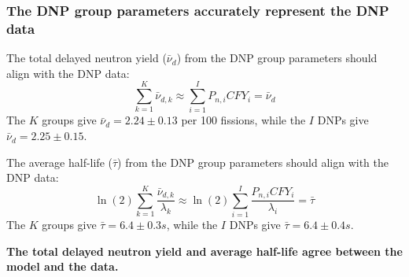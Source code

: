 \begin{frame}
\frametitle{The \gls{DNP} group parameters accurately represent the \gls{DNP} data}
\begin{block}{The total delayed neutron yield ($\bar{\nu}_d$) from the \gls{DNP} group parameters should align with the \gls{DNP} data:}
\begin{equation}
	\sum_{k=1}^{K} \bar{\nu}_{d,k} \approx \sum_{i=1}^I P_{n,i} CFY_i = \bar{\nu}_d
\end{equation}
The $K$ groups give $\bar{\nu}_d = 2.24 \pm 0.13$ per 100 fissions, while the $I$ \glspl{DNP} give $\bar{\nu}_d=2.25 \pm 0.15$.
\pause
\end{block}
\begin{block}{The average half-life ($\bar{\tau}$) from the \gls{DNP} group parameters should align with the \gls{DNP} data:}
\begin{equation}
	\ln (2) \sum_{k=1}^{K} \frac{\bar{\nu}_{d, k}}{\lambda_k} \approx \ln (2) \sum_{i=1}^I \frac{P_{n,i} CFY_i}{\lambda_i} = \bar{\tau}
\end{equation}
The $K$ groups give $\bar{\tau} = 6.4 \pm 0.3 s$, while the $I$ \glspl{DNP} give $\bar{\tau} = 6.4 \pm 0.4 s$.
\end{block}
\pause
\textbf{The total delayed neutron yield and average half-life agree between the model and the data.}
\end{frame}
